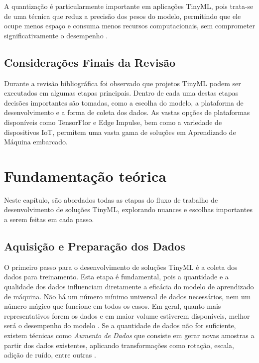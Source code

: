 \documentclass[repeatfields,xlists,xpacks,oneside]{ufrgscca}
\begin{document}
A quantização é particularmente importante em aplicações TinyML, pois trata-se de uma técnica que reduz a precisão dos pesos do modelo, permitindo que ele ocupe menos espaço e consuma menos recursos computacionais, sem comprometer significativamente o desempenho \cite{Jacob2018, Gholami2021}.

\section{Considerações Finais da Revisão}
Durante a revisão bibliográfica foi observado que projetos TinyML podem ser executados em algumas etapas principais. Dentro de cada uma destas etapas decisões importantes são tomadas, como a escolha do modelo, a plataforma de desenvolvimento e a forma de coleta dos dados. As vastas opções de plataformas disponíveis como TensorFlor e Edge Impulse, bem como a variedade de dispositivos IoT, permitem uma vasta gama de soluções em Aprendizado de Máquina embarcado. 

\chapter{Fundamentação teórica}
Neste capítulo, são abordados todas as etapas do fluxo de trabalho de desenvolvimento de soluções TinyML, explorando nuances e escolhas importantes a serem feitas em cada passo.

\section{Aquisição e Preparação dos Dados}

O primeiro passo para o desenvolvimento de soluções TinyML é a coleta dos dados para treinamento. Esta etapa é fundamental, pois a quantidade e a qualidade dos dados influenciam diretamente a eficácia do modelo de aprendizado de máquina. Não há um número mínimo universal de dados necessários, nem um número mágico que funcione em todos os casos. Em geral, quanto mais representativos forem os dados e em maior volume estiverem disponíveis, melhor será o desempenho do modelo \cite{datasetSize}. Se a quantidade de dados não for suficiente, existem técnicas como \textit{Aumento de Dados} que consiste em gerar novas amostras a partir dos dados existentes, aplicando transformações como rotação, escala, adição de ruído, entre outras \cite{Whang2023}.
\end{document}
